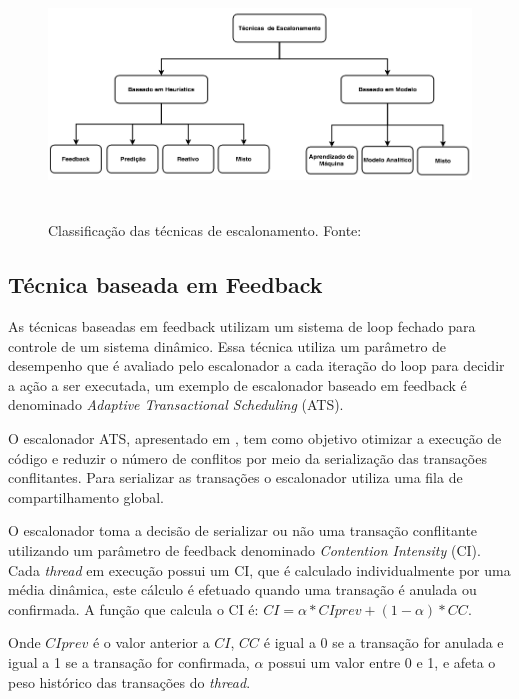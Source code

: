 \documentclass[ti]{texufpel}
\begin{document}
\begin{figure}[!htp]
\centering
\includegraphics[height=6.5cm]{Imagens/categoriasEscalonamento.png}
\caption{Classificação das técnicas de escalonamento. Fonte:~\cite{sanzo17}}
\label{figuraCategoria}
\end{figure}

\subsection{Técnica baseada em Feedback}

As técnicas baseadas em feedback utilizam um sistema de loop fechado para controle de um sistema dinâmico. Essa técnica utiliza um parâmetro de desempenho que é avaliado pelo escalonador a cada iteração do loop para decidir a ação a ser executada, um exemplo de escalonador baseado em feedback é denominado \emph{Adaptive Transactional Scheduling} (ATS).

O escalonador ATS, apresentado em \cite{yoo08}, tem como objetivo otimizar a execução de código e reduzir o número de conflitos por meio da serialização das transações conflitantes. Para serializar as transações o escalonador utiliza uma fila de compartilhamento global.

O escalonador toma a decisão de serializar ou não uma transação conflitante utilizando um parâmetro de feedback denominado \emph{Contention Intensity} (CI). Cada \emph{thread} em execução possui um CI, que é calculado individualmente por uma média dinâmica, este cálculo é efetuado quando uma transação é anulada ou confirmada. A função que calcula o CI é: $CI = \alpha * CIprev + (1 - \alpha) * CC$.

Onde $CIprev$ é o valor anterior a $CI$, $CC$ é igual a 0 se a transação for anulada e igual a 1 se a transação for confirmada, $\alpha$ possui um valor entre 0 e 1, e afeta o peso histórico das transações do \emph{thread}.
\end{document}
